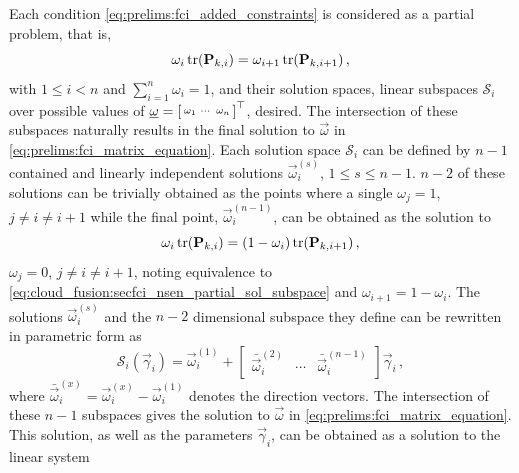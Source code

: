 Each condition \eqref{eq:prelims:fci_added_constraints} is considered as a partial problem, that is,
\begin{equation}\label{eq:cloud_fusion:secfci_nsen_partial_sol_subspace}
    \omega_i\tr(\mat{P}_{k,i}) = \omega_{i+1}\tr(\mat{P}_{k,i+1})\,,
\end{equation}
with $1\leq i< n$ and $\sum_{i=1}^n\omega_i=1$, and their solution spaces, linear subspaces $\mathcal{S}_i$ over possible values of $\vec{\omega}=\begin{bsmallmatrix}\omega_1 & \cdots & \omega_n\end{bsmallmatrix}^\top$, desired. The intersection of these subspaces naturally results in the final solution to $\vec{\omega}$ in \eqref{eq:prelims:fci_matrix_equation}. Each solution space $\mathcal{S}_i$ can be defined by $n-1$ contained and linearly independent solutions $\vec{\omega}_i^{(s)}$, $1\leq s\leq n-1$. $n-2$ of these solutions can be trivially obtained as the points where a single $\omega_j=1$, $j\neq i\neq i+1$ while the final point, $\vec{\omega}_i^{(n-1)}$, can be obtained as the solution to
\begin{equation}\label{eq:cloud_fusion:secfci_nsen_partial_sol_point}
    \omega_i\tr(\mat{P}_{k,i}) = (1-\omega_i)\tr(\mat{P}_{k,i+1})\,,
\end{equation}
$\omega_j=0$, $j\neq i\neq i+1$, noting equivalence to \eqref{eq:cloud_fusion:secfci_nsen_partial_sol_subspace} and $\omega_{i+1}=1-\omega_i$. The solutions $\vec{\omega}_i^{(s)}$ and the $n-2$ dimensional subspace they define can be rewritten in parametric form as
\begin{equation}\label{eq:cloud_fusion:secfci_nsen_partial_subspace}
    \mathcal{S}_i(\vec{\gamma}_i)=\vec{\omega}_i^{(1)} + 
    \begin{bmatrix}
        \bar{\vec{\omega}}_i^{(2)} & \cdots & \bar{\vec{\omega}}_i^{(n-1)}
    \end{bmatrix}
    \vec{\gamma}_i\,,
\end{equation}
where $\bar{\vec{\omega}}_i^{(x)}=\vec{\omega}_i^{(x)}-\vec{\omega}_i^{(1)}$ denotes the direction vectors. The intersection of these $n-1$ subspaces gives the solution to $\vec{\omega}$ in \eqref{eq:prelims:fci_matrix_equation}. This solution, as well as the parameters $\vec{\gamma}_i$, can be obtained as a solution to the linear system
